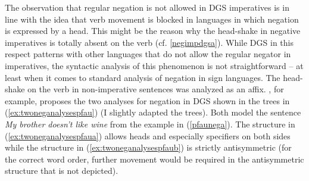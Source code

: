 The observation that regular negation is not allowed in DGS imperatives is in line with the idea that verb movement is blocked in languages in which negation is expressed by a head. This might be the reason why the head-shake in negative imperatives is totally absent on the verb (cf. \ref{negimpdgsa}). While DGS in this respect patterns with other languages that do not allow the regular negator in imperatives, the syntactic analysis of this phenomenon is not straightforward -- at least when it comes to standard analysis of negation in sign languages. The head-shake on the verb in non-imperative sentences was analyzed as an affix. \citet[57]{pfau2016featural}, for example, proposes the two analyses for negation in DGS shown in the trees in (\ref{ex:twoneganalysespfau}) (I slightly adapted the trees). Both model the sentence \textit{My brother doesn't like wine} from the example in (\ref{pfaunega}). The structure in (\ref{ex:twoneganalysespfaua}) allows heads and especially specifiers on both sides while the structure in (\ref{ex:twoneganalysespfaub}) is strictly antisymmetric (for the correct word order, further movement would be required in the antisymmetric structure that is not depicted).


